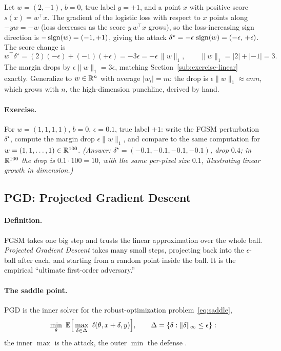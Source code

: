 \begin{example}
Let $w=(2,-1)$, $b=0$, true label $y=+1$, and a point $x$ with positive score $s(x)=w^\top x$. The gradient of the logistic loss with respect to $x$ points along $-yw=-w$ (loss decreases as the score $y\,w^\top x$ grows), so the loss-increasing sign direction is $-\operatorname{sign}(w)=(-1,+1)$, giving the attack $\delta^\star = -\epsilon\,\operatorname{sign}(w) = (-\epsilon,\,+\epsilon)$. The score change is
\[
  w^\top\delta^\star = (2)(-\epsilon) + (-1)(+\epsilon) = -3\epsilon = -\epsilon\,\|w\|_1, \qquad \|w\|_1=|2|+|-1|=3.
\]
The margin drops by $\epsilon\|w\|_1=3\epsilon$, matching Section~\ref{sub:exercise-linear} exactly. Generalize to $w\in\mathbb{R}^n$ with average $|w_i|=m$: the drop is $\epsilon\|w\|_1\approx \epsilon m n$, which grows with $n$, the high-dimension punchline, derived by hand.
\end{example}

\paragraph{Exercise.} For $w=(1,1,1,1)$, $b=0$, $\epsilon=0.1$, true label $+1$: write the FGSM perturbation $\delta^\star$, compute the margin drop $\epsilon\|w\|_1$, and compare to the same computation for $w=(1,1,\dots,1)\in\mathbb{R}^{100}$. \emph{(Answer: $\delta^\star=(-0.1,-0.1,-0.1,-0.1)$, drop $0.4$; in $\mathbb{R}^{100}$ the drop is $0.1\cdot100=10$, with the same per-pixel size $0.1$, illustrating linear growth in dimension.)}

\subsection{PGD: Projected Gradient Descent}
\label{sub:pgd}

\paragraph{Definition.} FGSM takes one big step and trusts the linear approximation over the whole ball. \emph{Projected Gradient Descent} \citep{madry2018towards} takes many small steps, projecting back into the $\epsilon$-ball after each, and starting from a random point inside the ball. It is the empirical ``ultimate first-order adversary.''

\paragraph{The saddle point.} PGD is the inner solver for the robust-optimization problem~\eqref{eq:saddle},
\[
  \min_\theta\ \E\Big[\max_{\delta\in\Delta}\ \ell(\theta,x+\delta,y)\Big],
  \qquad \Delta=\{\delta:\|\delta\|_\infty\le\epsilon\}:
\]
the inner $\max$ is the attack, the outer $\min$ the defense \citep{madry2018towards}.

